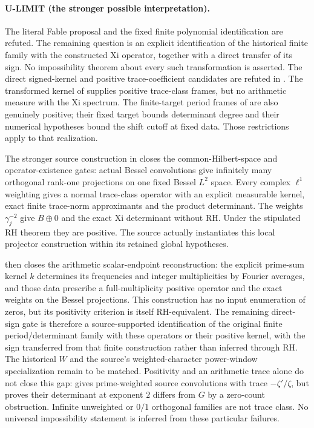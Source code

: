 \paragraph{U-LIMIT (the stronger possible interpretation).}
The literal Fable proposal and the fixed finite polynomial identification are refuted. The remaining question is an explicit identification of the historical finite family with the constructed Xi operator, together with a direct transfer of its sign. No impossibility theorem about every such transformation is asserted. The direct signed-kernel and positive trace-coefficient candidates are refuted in . The transformed kernel of  supplies positive trace-class frames, but no arithmetic measure with the Xi spectrum. The finite-target period frames of  are also genuinely positive; their fixed target bounds determinant degree and their numerical hypotheses bound the shift cutoff at fixed data. Those restrictions apply to that realization.

The stronger source construction in  closes the common-Hilbert-space and operator-existence gates: actual Bessel convolutions give infinitely many orthogonal rank-one projections on one fixed Bessel $L^2$ space. Every complex $\ell^1$ weighting gives a normal trace-class operator with an explicit measurable kernel, exact finite trace-norm approximants and the product determinant. The weights $\gamma_j^{-2}$ give $B\oplus0$ and the exact Xi determinant without RH. Under the stipulated RH theorem they are positive. The source actually instantiates this local projector construction within its retained global hypotheses.

 then closes the arithmetic scalar-endpoint reconstruction: the explicit prime-sum kernel $k$ determines its frequencies and integer multiplicities by Fourier averages, and those data prescribe a full-multiplicity positive operator and the exact weights on the Bessel projections. This construction has no input enumeration of zeros, but its positivity criterion is itself RH-equivalent. The remaining direct-sign gate is therefore a source-supported identification of the original finite period/determinant family with these operators or their positive kernel, with the sign transferred from that finite construction rather than inferred through RH. The historical $W$ and the source's weighted-character power-window specialization remain to be matched. Positivity and an arithmetic trace alone do not close this gap:  gives prime-weighted source convolutions with trace $-\zeta'/\zeta$, but proves their determinant at exponent $2$ differs from $G$ by a zero-count obstruction. Infinite unweighted or $0/1$ orthogonal families are not trace class. No universal impossibility statement is inferred from these particular failures.

